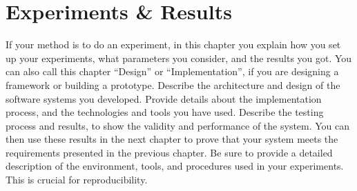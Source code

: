 \chapter{Experiments \& Results}%
\label{ch:experiments}

If your method is to do an experiment, in this chapter you explain how you set up your experiments, what parameters you consider, and the results you got.
You can also call this chapter ``Design'' or ``Implementation'', if you are designing a framework or building a prototype.
Describe the architecture and design of the software systems you developed.
Provide details about the implementation process, and the technologies and tools you have used.
Describe the testing process and results, to show the validity and performance of the system.
You can then use these results in the next chapter to prove that your system meets the requirements presented in the previous chapter.
Be sure to provide a detailed description of the environment, tools, and procedures used in your experiments.
This is crucial for reproducibility.
